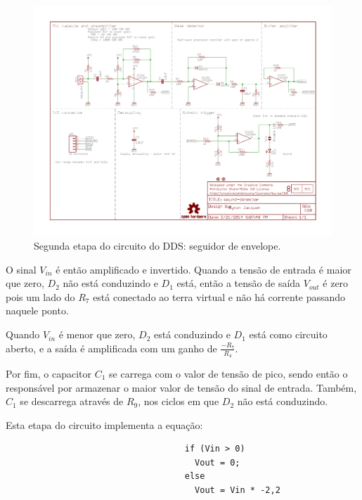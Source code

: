 \documentclass[
    12pt,               %
    openright,          %
    oneside,
    a4paper,            
    english,            %
    brazil              %
    ]{abntex2}
\begin{document}
\begin{figure}[!htb]
  \begin{center}
    \caption{\label{seg}Segunda etapa do circuito do DDS: seguidor de envelope.}
    \includegraphics[scale=1.2]{images/schematic.pdf}
  \end{center}
\end{figure}

O sinal $V_{in}$ é então amplificado e invertido. Quando a tensão de entrada é maior que zero, $D_2$ não está conduzindo e $D_1$ está, então a tensão de saída $V_{out}$ é zero pois um lado do $R_7$ está conectado ao terra virtual e não há corrente passando naquele ponto. 

Quando $V_{in}$ é menor que zero, $D_2$ está conduzindo e $D_1$ está como circuito aberto, e a saída é amplificada com um ganho de $\frac{-R_7}{R_4}$. 

Por fim, o capacitor $C_1$ se carrega com o valor de tensão de pico, sendo então o responsável por armazenar o maior valor de tensão do sinal de entrada. Também, $C_1$ se descarrega através de $R_9$, nos ciclos em que $D_2$ não está conduzindo.

Esta etapa do circuito implementa a equação:

\begin{figure}[!htb]
  \begin{center}
      \begin{verbatim}
                              if (Vin > 0) 
                                Vout = 0;
                              else
                                Vout = Vin * -2,2 
      \end{verbatim}
    \end{center}
\end{figure}
\end{document}
